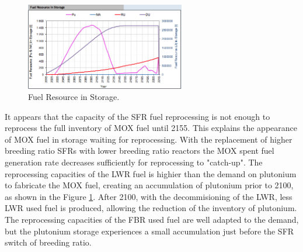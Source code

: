 \documentclass[12pt]{article}
\begin{document}
\begin{figure}[h!]
    \centering
    \includegraphics[width=0.62\textwidth]{img/FuelInStorage_1}
    \caption{Fuel Resource in Storage.}
    \label{fig:storagecompo_1}
\end{figure}

It appears that the capacity of the SFR fuel reprocessing is not enough to
reprocess the full inventory of MOX fuel until 2155. This explains the
appearance of MOX fuel in storage waiting for reprocessing. 
With the
replacement of higher breeding ratio SFRs with lower breeding ratio reactors
the MOX spent fuel generation rate decreases sufficiently for reprocessing to
"catch-up".
The reprocessing capacities of
the LWR fuel is highier than the demand on plutonium to fabricate the MOX fuel,
creating an accumulation of plutonium prior to 2100, 
as shown in the Figure \ref{fig:storagecompo_1}. After 2100, with the
decommisioning of the LWR, less LWR used fuel is produced, allowing the reduction of
the inventory of plutonium. The reprocessing capacities of the
FBR used fuel are well adapted to the demand, but the plutonium storage experiences a
small accumulation just before the SFR switch of breeding ratio.
 

\end{document}
